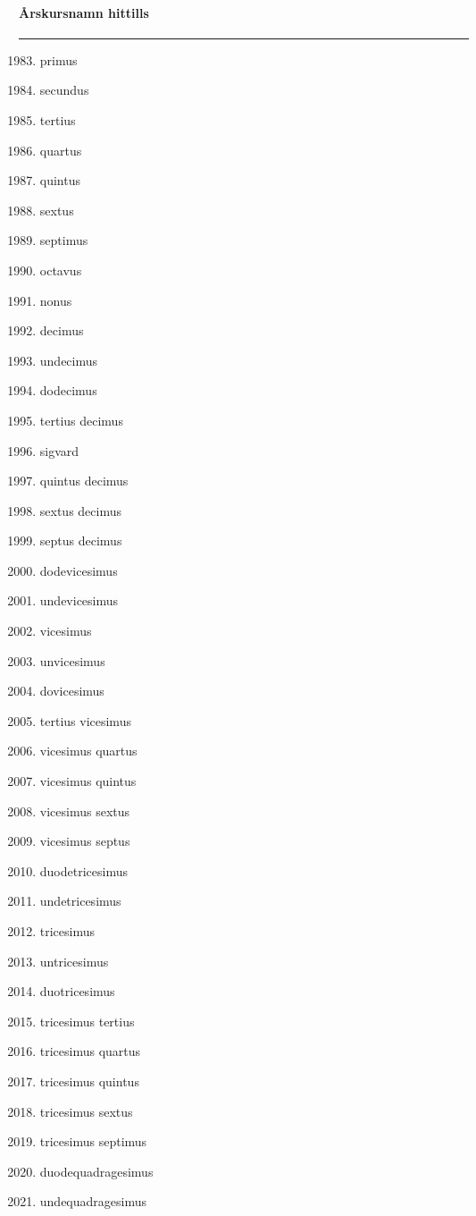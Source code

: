 \begin{song}
\begin{songnotes}
\paragraph{Årskursnamn hittills}
\rule{\textwidth}{0pt}
\begin{multicols}{2}
\begin{enumerate}
\setcounter{enumi}{1982}
\setlength{\itemsep}{0cm}
\setlength{\parskip}{0cm}
\item primus
\item secundus
\item tertius
\item quartus
\item quintus
\item sextus
\item septimus
\item octavus
\item nonus
\item decimus
\item undecimus
\item dodecimus
\item tertius decimus
\item sigvard
\item quintus decimus
\item sextus decimus
\item septus decimus
\item dodevicesimus
\item undevicesimus
\item vicesimus
\item unvicesimus
\item dovicesimus
\item tertius vicesimus
\item vicesimus quartus
\item vicesimus quintus
\item vicesimus sextus
\item vicesimus septus
\item duodetricesimus
\item undetricesimus
\item tricesimus
\item untricesimus
\item duotricesimus
\item tricesimus tertius
\item tricesimus quartus
\item tricesimus quintus
\item tricesimus sextus
\item tricesimus septimus
\item duodequadragesimus
\item undequadragesimus
\end{enumerate}
\end{multicols}
\end{songnotes}

\end{song}
